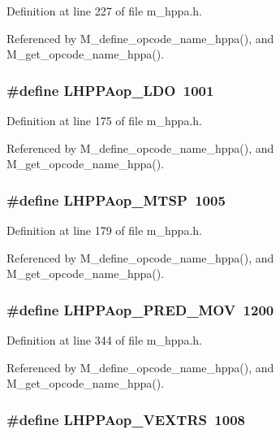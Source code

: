 Definition at line 227 of file m\_\-hppa.h.

Referenced by M\_\-define\_\-opcode\_\-name\_\-hppa(), and M\_\-get\_\-opcode\_\-name\_\-hppa().
\subsubsection{\setlength{\rightskip}{0pt plus 5cm}\#define LHPPAop\_\-LDO~1001}\label{m__hppa_8h_70ca31f85f076a66450b0fdcd8038151}




Definition at line 175 of file m\_\-hppa.h.

Referenced by M\_\-define\_\-opcode\_\-name\_\-hppa(), and M\_\-get\_\-opcode\_\-name\_\-hppa().
\subsubsection{\setlength{\rightskip}{0pt plus 5cm}\#define LHPPAop\_\-MTSP~1005}\label{m__hppa_8h_0d5d9c88e242a8d730213f72a5c677e9}




Definition at line 179 of file m\_\-hppa.h.

Referenced by M\_\-define\_\-opcode\_\-name\_\-hppa(), and M\_\-get\_\-opcode\_\-name\_\-hppa().
\subsubsection{\setlength{\rightskip}{0pt plus 5cm}\#define LHPPAop\_\-PRED\_\-MOV~1200}\label{m__hppa_8h_942494b4eca64853ac195366bbce324c}




Definition at line 344 of file m\_\-hppa.h.

Referenced by M\_\-define\_\-opcode\_\-name\_\-hppa(), and M\_\-get\_\-opcode\_\-name\_\-hppa().
\subsubsection{\setlength{\rightskip}{0pt plus 5cm}\#define LHPPAop\_\-VEXTRS~1008}\label{m__hppa_8h_552807bbdd129b1d08f4e62d7e61d13f}




